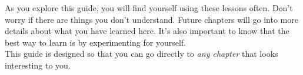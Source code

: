 \vspace{16pt}

As you explore this guide, you will find yourself using these lessons often.
Don't worry if there are things you don't understand.  Future chapters will go
into more details about what you have learned here.  It's also important to
know that the best way to learn is by experimenting for yourself.\\

This guide is designed so that you can go directly to \emph{any chapter} that
looks interesting to you.


\@openrighttrue\makeatother

